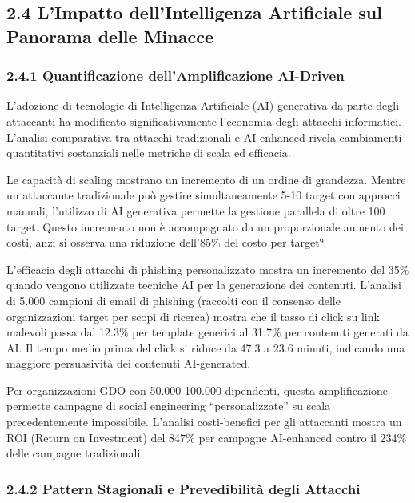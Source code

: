 \documentclass{report}
\begin{document}
\subsection{2.4 L'Impatto dell'Intelligenza Artificiale sul Panorama
delle
Minacce}\label{limpatto-dellintelligenza-artificiale-sul-panorama-delle-minacce}

\subsubsection{2.4.1 Quantificazione dell'Amplificazione
AI-Driven}\label{quantificazione-dellamplificazione-ai-driven}

L'adozione di tecnologie di Intelligenza Artificiale (AI) generativa da
parte degli attaccanti ha modificato significativamente l'economia degli
attacchi informatici. L'analisi comparativa tra attacchi tradizionali e
AI-enhanced rivela cambiamenti quantitativi sostanziali nelle metriche
di scala ed efficacia.

Le capacità di scaling mostrano un incremento di un ordine di grandezza.
Mentre un attaccante tradizionale può gestire simultaneamente 5-10
target con approcci manuali, l'utilizzo di AI generativa permette la
gestione parallela di oltre 100 target. Questo incremento non è
accompagnato da un proporzionale aumento dei costi, anzi si osserva una
riduzione dell'85\% del costo per target⁹.

L'efficacia degli attacchi di phishing personalizzato mostra un
incremento del 35\% quando vengono utilizzate tecniche AI per la
generazione dei contenuti. L'analisi di 5.000 campioni di email di
phishing (raccolti con il consenso delle organizzazioni target per scopi
di ricerca) mostra che il tasso di click su link malevoli passa dal
12.3\% per template generici al 31.7\% per contenuti generati da AI. Il
tempo medio prima del click si riduce da 47.3 a 23.6 minuti, indicando
una maggiore persuasività dei contenuti AI-generated.

Per organizzazioni GDO con 50.000-100.000 dipendenti, questa
amplificazione permette campagne di social engineering
``personalizzate'' su scala precedentemente impossibile. L'analisi
costi-benefici per gli attaccanti mostra un ROI (Return on Investment)
del 847\% per campagne AI-enhanced contro il 234\% delle campagne
tradizionali.

\subsubsection{2.4.2 Pattern Stagionali e Prevedibilità degli
Attacchi}\label{pattern-stagionali-e-prevedibilituxe0-degli-attacchi}
\end{document}
